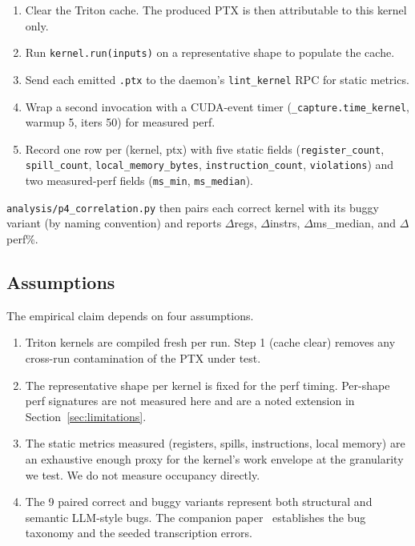 \documentclass[runningheads]{llncs}
\begin{document}
\begin{enumerate}
\item Clear the Triton cache. The produced PTX is then attributable to
this kernel only.
\item Run \texttt{kernel.run(inputs)} on a representative shape to
populate the cache.
\item Send each emitted \texttt{.ptx} to the daemon's
\texttt{lint\_kernel} RPC for static metrics.
\item Wrap a second invocation with a CUDA-event timer
(\texttt{\_capture.time\_kernel}, warmup 5, iters 50) for measured
perf.
\item Record one row per (kernel, ptx) with five static fields
(\texttt{register\_count}, \texttt{spill\_count},
\texttt{local\_memory\_bytes}, \texttt{instruction\_count},
\texttt{violations}) and two measured-perf fields
(\texttt{ms\_min}, \texttt{ms\_median}).
\end{enumerate}

\texttt{analysis/p4\_correlation.py} then pairs each correct kernel
with its buggy variant (by naming convention) and reports
$\Delta$regs, $\Delta$instrs, $\Delta$ms\_median, and $\Delta$perf\%.

\subsection{Assumptions}
\label{sec:method:assumptions}

The empirical claim depends on four assumptions.

\begin{enumerate}
\item Triton kernels are compiled fresh per run. Step 1 (cache clear)
removes any cross-run contamination of the PTX under test.
\item The representative shape per kernel is fixed for the perf timing.
Per-shape perf signatures are not measured here and are a noted
extension in Section~\ref{sec:limitations}.
\item The static metrics measured (registers, spills, instructions,
local memory) are an exhaustive enough proxy for the kernel's work
envelope at the granularity we test. We do not measure occupancy
directly.
\item The 9 paired correct and buggy variants represent both structural
and semantic LLM-style bugs. The companion paper~\cite{gpuemuP1}
establishes the bug taxonomy and the seeded transcription errors.
\end{enumerate}
\end{document}
